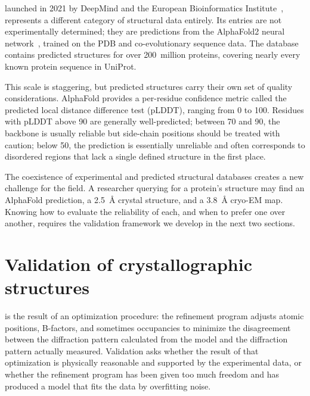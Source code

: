 launched in
2021 by DeepMind and the European Bioinformatics Institute~\cite{varadi2022}, represents
a different category of structural data entirely. Its entries are not
experimentally determined; they are predictions from the AlphaFold2
neural network~\cite{jumper2021}, trained on the PDB and co-evolutionary sequence data.
The database contains predicted structures for over 200~million
proteins, covering nearly every known protein sequence in UniProt.

This scale is staggering, but predicted structures carry their own set
of quality considerations. AlphaFold provides a per-residue confidence
metric called the predicted local distance difference test (pLDDT),
ranging from 0 to 100. Residues with pLDDT above 90 are generally
well-predicted; between 70 and 90, the backbone is usually reliable
but side-chain positions should be treated with caution; below 50,
the prediction is essentially unreliable and often corresponds to
disordered regions that lack a single defined structure in the first
place.

The coexistence of experimental and predicted structural databases
creates a new challenge for the field. A researcher querying for a
protein's structure may find an AlphaFold prediction, a 2.5~{\AA}
crystal structure, and a 3.8~{\AA} cryo-EM map. Knowing how to
evaluate the reliability of each, and when to prefer one over
another, requires the validation framework we develop in the next
two sections.


\section{Validation of crystallographic structures}
\label{sec:validation}

 is the result of an
optimization procedure: the refinement program adjusts atomic
positions, B-factors, and sometimes occupancies to minimize the
disagreement between the diffraction pattern calculated from the
model and the diffraction pattern actually measured. Validation
asks whether the result of that optimization is physically
reasonable and supported by the experimental data, or whether the
refinement program has been given too much freedom and has
produced a model that fits the data by overfitting noise.

